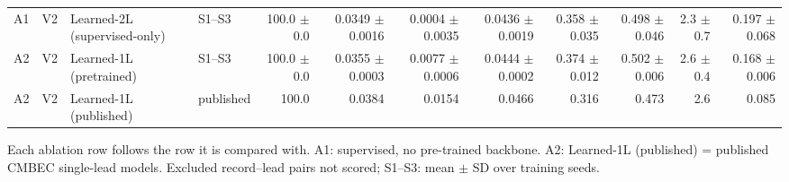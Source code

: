 \begin{table}[htbp]
\begin{tabular}{llllrrrrrrrr}
A1 & V2 & Learned-2L (supervised-only) & S1--S3 & 100.0 $\pm$ 0.0 & 0.0349 $\pm$ 0.0016 & 0.0004 $\pm$ 0.0035 & 0.0436 $\pm$ 0.0019 & 0.358 $\pm$ 0.035 & 0.498 $\pm$ 0.046 & 2.3 $\pm$ 0.7 & 0.197 $\pm$ 0.068 \\
A2 & V2 & Learned-1L (pretrained) & S1--S3 & 100.0 $\pm$ 0.0 & 0.0355 $\pm$ 0.0003 & 0.0077 $\pm$ 0.0006 & 0.0444 $\pm$ 0.0002 & 0.374 $\pm$ 0.012 & 0.502 $\pm$ 0.006 & 2.6 $\pm$ 0.4 & 0.168 $\pm$ 0.006 \\
A2 & V2 & Learned-1L (published) & published & 100.0 & 0.0384 & 0.0154 & 0.0466 & 0.316 & 0.473 & 2.6 & 0.085 \\
\bottomrule
\end{tabular}

\par\smallskip\footnotesize Each ablation row follows the row it is compared with. A1: supervised, no pre-trained backbone. A2: Learned-1L (published) = published CMBEC single-lead models. Excluded record--lead pairs not scored; S1--S3: mean $\pm$ SD over training seeds.
\end{table}
